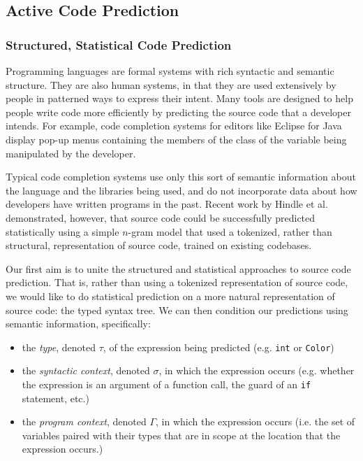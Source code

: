 \subsection{Active Code Prediction}
\subsubsection{Structured, Statistical Code Prediction}

Programming languages are formal systems with rich syntactic and semantic structure. They are
also human systems, in that they are used extensively by people in patterned ways to express their
intent. Many tools are designed to help people write code more efficiently by predicting
the source code that a developer intends. For example, code completion systems for editors like Eclipse for Java display pop-up menus containing the members of the class of the variable being manipulated by the developer.

Typical code completion systems use only this sort of semantic
information about the language and the libraries being used, and do not incorporate data about how developers have written programs
in the past. Recent work by Hindle et al.~\cite{Hindle:2012:NS:2337223.2337322} demonstrated, however, that source code could be successfully predicted statistically
using a simple $n$-gram model that used a tokenized, rather than structural, representation of source code, trained on existing codebases.

Our first aim is to unite the structured and statistical approaches to source code prediction. That is, rather than using a tokenized representation of source code, we would like to do statistical prediction on a more natural representation of source code: the typed syntax tree.  We can then condition our predictions using semantic information, specifically:
\begin{itemize}
\item the \emph{type}, denoted $\tau$, of the expression being predicted (e.g. \verb|int| or \verb|Color|)
\item the \emph{syntactic context}, denoted $\sigma$, in which the expression occurs (e.g. whether the expression is an argument of a function call, the guard of an \verb|if| statement, etc.)
\item the \emph{program context}, denoted $\Gamma$, in which the expression occurs (i.e. the set of variables paired with their types that are in scope at the location that the expression occurs.)
\end{itemize}

